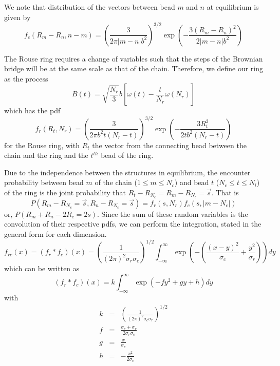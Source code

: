 \documentclass{report}
\begin{document}
We note that distribution of the vectors between bead $m$ and $n$ at equilibrium is given by 
\begin{equation*}
f_c(R_m-R_n,n-m)= \left(\frac{3}{2\pi|m-n|b^2 }\right)^{3/2}\exp(-\frac{3(R_m-R_n)^2}{2|m-n|b^2})
\end{equation*}

The Rouse ring requires a change of variables such that the steps of the Brownian bridge will be at the same scale as that of the chain. Therefore, we define our ring as the process 
\begin{equation*}
B(t)= \sqrt{\frac{N_r}{3}}b[\omega(t)-\frac{t}{N_r}\omega(N_r)]
\end{equation*}
which has the pdf 
\begin{equation*}
f_r(R_t,N_r) = \left(\frac{3}{2\pi b^2t(N_r-t)}\right)^{3/2} \exp \left(-\frac{3R_t^2}{2tb^2(N_r-t)}\right)
\end{equation*}
for the Rouse ring, with $R_t$ the vector from the connecting bead between the chain and the ring and the $t^{th}$ bead of the ring. 

Due to the independence between the structures in equilibrium, the encounter probability between bead $m$ of the chain ($1\leq m \leq N_c$) and bead $t$ ($N_c\leq t \leq N_l$) of the ring is the joint probability that $R_t-R_{N_c}= R_m-R_{N_c}=\vec{s}$. That is 
\begin{equation*}
P(R_m-R_{N_c}=\vec{s}, R_n-R_{N_c}=\vec{s})=f_r(s,N_r)f_c(s,|m-N_c|)
\end{equation*}
or, $P(R_m+R_n-2R_c=2s)$. Since the sum of these random variables is the convolution of their respective pdfs, we can perform the integration, stated in the general form for each dimension.
\begin{equation*}
f_{rc}(x)=\left(f_r*f_c\right)(x)=\left(\frac{1}{(2\pi)^2 \sigma_r\sigma_c} \right)^{1/2}\int_{-\infty}^{\infty}\exp\left(- \left(\frac{(x-y)^2}{\sigma_c}+\frac{y^2}{\sigma_r}\right)\right)dy
\end{equation*}
which can be written as
\begin{equation*}
\left(f_r*f_c\right)(x)=k\int_{-\infty}^{\infty}\exp(-fy^2+gy+h)dy
\end{equation*}
with 
\begin{eqnarray*}
k &=& \left(\frac{1}{(2\pi)^2 \sigma_c\sigma_r}\right)^{1/2}\\
f &=& \frac{\sigma_c+\sigma_r}{2\sigma_r\sigma_c}\\
g &=& \frac{x}{\sigma_c}\\
h &=& -\frac{x^2}{2\sigma_c}
\end{eqnarray*}
\end{document}
